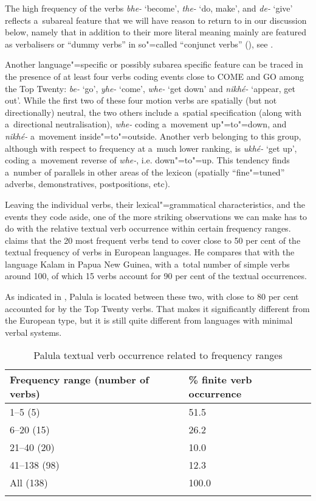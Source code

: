 The high frequency of the verbs \textit{bhe-} `become', \textit{the-} `do, make', and \textit{de-} `give' reflects a~subareal feature that we will have reason to return to in our discussion below, namely that in addition to their more literal meaning mainly are featured as verbalisers \citep[368]{masica1991} or ``dummy verbs'' in so"=called ``conjunct verbs'' (\citeyear[326]{masica1991}), see . 



Another language"=specific or possibly subarea specific feature can be traced in the presence of at least four verbs coding events close to COME and GO among the Top Twenty: \textit{be-} `go', \textit{yhe-} `come', \textit{whe-} `get down' and \textit{nikhé-} `appear, get out'. While the first two of these four motion verbs are spatially (but not directionally) neutral, the two others include a~spatial specification (along with a~directional neutralisation), \textit{whe-} coding a~movement up"=to"=down, and \textit{nikhé-} a~movement inside"=to"=outside. Another verb belonging to this group, although with respect to frequency at a~much lower ranking, is \textit{ukhé-} `get up', coding a~movement reverse of \textit{whe-}, i.e. down"=to"=up. This tendency finds a~number of parallels in other areas of the lexicon (spatially ``fine"=tuned'' adverbs, demonstratives, postpositions, etc).



Leaving the individual verbs, their lexical"=grammatical characteristics, and the events they code aside, one of the more striking observations we can make has to do with the relative textual verb occurrence within certain frequency ranges. \citet[409]{viberg2006} claims that the 20 most frequent verbs tend to cover close to 50 per cent of the textual frequency of verbs in European languages. He compares that with the language Kalam in Papua New Guinea, with a~total number of simple verbs around 100, of which 15 verbs account for 90 per cent of the textual occurrences. 



As indicated in , Palula is located between these two, with close to 80 per cent accounted for by the Top Twenty verbs. That makes it significantly different from the European type, but it is still quite different from languages with minimal verbal systems. 


\begin{table}[ht]
\caption{Palula textual verb occurrence related to frequency ranges}

\begin{tabularx}{\textwidth}{ Q P{50mm} }
\lsptoprule
Frequency range (number of verbs) &
\% finite verb occurrence\\--5 (5) &
\phantom{1}51.5\\
6--20 (15) &
\phantom{1}26.2\\
21--40 (20) &
\phantom{1}10.0\\
41--138 (98) &
\phantom{1}12.3\\
All (138) &
100.0\\\lspbottomrule
\end{tabularx}
\label{tab:8-2}
\end{table}


